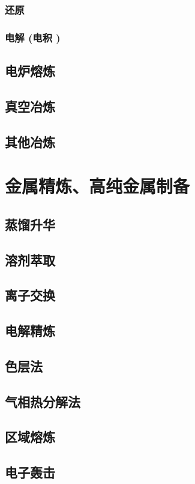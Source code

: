 \documentclass[UTF8]{../../ApplicationUniverse}
\begin{document}
        \subsubsection{还原}
        \subsubsection{电解 (电积 )}
    \subsection{电炉熔炼}
    \subsection{真空冶炼}
    \subsection{其他冶炼}
\section{金属精炼、高纯金属制备}
    \subsection{蒸馏升华}
    \subsection{溶剂萃取}
    \subsection{离子交换}
    \subsection{电解精炼}
    \subsection{色层法}
    \subsection{气相热分解法}
    \subsection{区域熔炼}
    \subsection{电子轰击}
\end{document}
